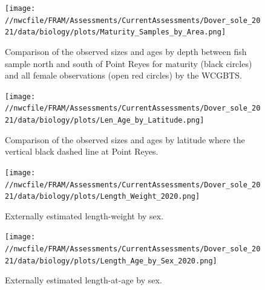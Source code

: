 \documentclass[11pt,
  english,
  a4paper,
]{article}
\begin{document}
\tagmcend\tagstructend


\begin{figure}
\centering
\texttt{[image: //nwcfile/FRAM/Assessments/CurrentAssessments/Dover\_sole\_2021/data/biology/plots/Maturity\_Samples\_by\_Area.png]}
\caption{Comparison of the observed sizes and ages by depth between fish sample north and south of Point Reyes for maturity (black circles) and all female observations (open red circles) by the WCGBTS.\label{fig:samples-north-south}}
\end{figure}

\tagmcend\tagstructend


\begin{figure}
\centering
\texttt{[image: //nwcfile/FRAM/Assessments/CurrentAssessments/Dover\_sole\_2021/data/biology/plots/Len\_Age\_by\_Latitude.png]}
\caption{Comparison of the observed sizes and ages by latitude where the vertical black dashed line at Point Reyes.\label{fig:fish-by-lat}}
\end{figure}

\tagmcend\tagstructend


\begin{figure}
\centering
\texttt{[image: //nwcfile/FRAM/Assessments/CurrentAssessments/Dover\_sole\_2021/data/biology/plots/Length\_Weight\_2020.png]}
\caption{Externally estimated length-weight by sex.\label{fig:est-len-wght}}
\end{figure}

\tagmcend\tagstructend


\begin{figure}
\centering
\texttt{[image: //nwcfile/FRAM/Assessments/CurrentAssessments/Dover\_sole\_2021/data/biology/plots/Length\_Age\_by\_Sex\_2020.png]}
\caption{Externally estimated length-at-age by sex.\label{fig:est-len-at-age}}
\end{figure}
\end{document}
